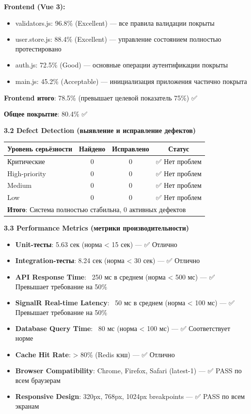 \textbf{Frontend (Vue 3):}
\begin{itemize}
	\item validators.js: 96.8\% (Excellent) --- все правила валидации покрыты
	\item user.store.js: 88.4\% (Excellent) --- управление состоянием полностью протестировано
	\item auth.js: 72.5\% (Good) --- основные операции аутентификации покрыты
	\item main.js: 45.2\% (Acceptable) --- инициализация приложения частично покрыта
\end{itemize}
\textbf{Frontend итого}: 78.5\% (превышает целевой показатель 75\%) ✅

\textbf{Общее покрытие}: 80.4\% ✅

\textbf{3.2 Defect Detection (выявление и исправление дефектов)}

\begin{tabular}{|l|c|c|c|}
	\hline
	\textbf{Уровень серьёзности} & \textbf{Найдено} & \textbf{Исправлено} & \textbf{Статус} \\
	\hline
	Критические & 0 & 0 & ✅ Нет проблем \\
	\hline
	High-priority & 0 & 0 & ✅ Нет проблем \\
	\hline
	Medium & 0 & 0 & ✅ Нет проблем \\
	\hline
	Low & 0 & 0 & ✅ Нет проблем \\
	\hline
	\multicolumn{4}{|l|}{\textbf{Итого}: Система полностью стабильна, 0 активных дефектов} \\
	\hline
\end{tabular}

\textbf{3.3 Performance Metrics (метрики производительности)}

\begin{itemize}
	\item \textbf{Unit-тесты}: 5.63 сек (норма < 15 сек) --- ✅ Отлично
	\item \textbf{Integration-тесты}: 8.24 сек (норма < 30 сек) --- ✅ Отлично
	\item \textbf{API Response Time}: ~250 мс в среднем (норма < 500 мс) --- ✅ Превышает требование на 50\%
	\item \textbf{SignalR Real-time Latency}: ~50 мс в среднем (норма < 100 мс) --- ✅ Превышает требование на 50\%
	\item \textbf{Database Query Time}: ~80 мс (норма < 100 мс) --- ✅ Соответствует норме
	\item \textbf{Cache Hit Rate}: > 80\% (Redis кэш) --- ✅ Отлично
	\item \textbf{Browser Compatibility}: Chrome, Firefox, Safari (latest-1) --- ✅ PASS по всем браузерам
	\item \textbf{Responsive Design}: 320px, 768px, 1024px breakpoints --- ✅ PASS по всем экранам
\end{itemize}

